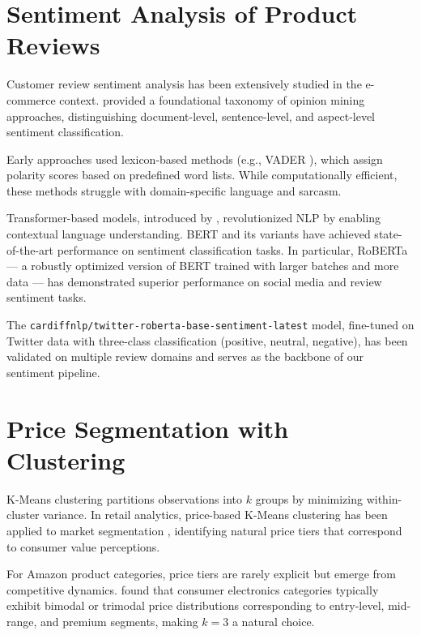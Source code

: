 \section{Sentiment Analysis of Product Reviews}

Customer review sentiment analysis has been extensively studied in the e-commerce
context. \cite{liu2012sentiment} provided a foundational taxonomy of opinion mining
approaches, distinguishing document-level, sentence-level, and aspect-level sentiment
classification.

Early approaches used lexicon-based methods (e.g., VADER \cite{hutto2014vader}),
which assign polarity scores based on predefined word lists. While computationally
efficient, these methods struggle with domain-specific language and sarcasm.

Transformer-based models, introduced by \cite{vaswani2017attention}, revolutionized
NLP by enabling contextual language understanding. BERT \cite{devlin2019bert} and its
variants have achieved state-of-the-art performance on sentiment classification tasks.
In particular, RoBERTa \cite{liu2019roberta} — a robustly optimized version of BERT
trained with larger batches and more data — has demonstrated superior performance on
social media and review sentiment tasks.

The \texttt{cardiffnlp/twitter-roberta-base-sentiment-latest} model, fine-tuned on
Twitter data with three-class classification (positive, neutral, negative), has been
validated on multiple review domains \cite{loureiro2022timelms} and serves as the
backbone of our sentiment pipeline.

\section{Price Segmentation with Clustering}

K-Means clustering \cite{macqueen1967kmeans} partitions observations into $k$ groups
by minimizing within-cluster variance. In retail analytics, price-based K-Means
clustering has been applied to market segmentation \cite{wedel2000marketSegmentation},
identifying natural price tiers that correspond to consumer value perceptions.

For Amazon product categories, price tiers are rarely explicit but emerge from
competitive dynamics. \cite{smith2019pricing} found that consumer electronics
categories typically exhibit bimodal or trimodal price distributions corresponding
to entry-level, mid-range, and premium segments, making $k=3$ a natural choice.

